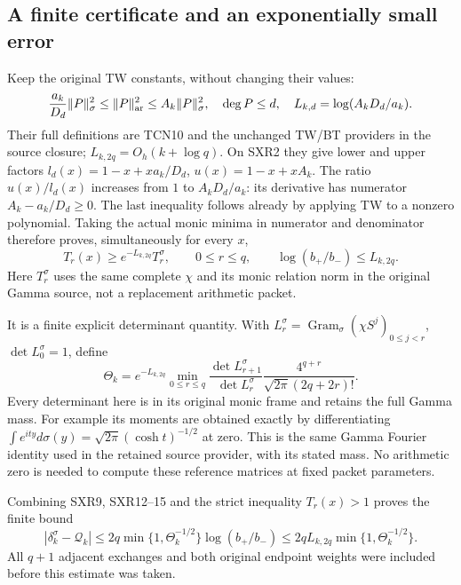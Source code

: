 \subsection{A finite certificate and an exponentially small error}

Keep the original TW constants, without changing their values:
\[
 \frac{a_k}{D_d}\|P\|_\sigma^2\le\|P\|_{\rm ar}^2
                      \le A_k\|P\|_\sigma^2,
 \quad \deg P\le d,\quad
 L_{k,d}=\log(A_kD_d/a_k).
\]
Their full definitions are TCN10 and the unchanged TW/BT providers
in the source closure; $L_{k,2q}=O_h(k+\log q)$. On SXR2 they
give lower and upper factors
$l_d(x)=1-x+x a_k/D_d$, $u(x)=1-x+xA_k$.
The ratio $u(x)/l_d(x)$ increases from $1$ to
$A_kD_d/a_k$: its derivative has numerator $A_k-a_k/D_d\ge0$.
The last inequality follows already by applying TW to a nonzero
polynomial. Taking the actual monic minima in numerator and
denominator therefore proves, simultaneously for every $x$,
\begin{equation}\tag{SXR14}
 T_r(x)\ge e^{-L_{k,2q}}T_r^\sigma,
 \qquad 0\le r\le q,\qquad
 \log(b_+/b_-)\le L_{k,2q}.
\end{equation}
Here $T_r^\sigma$ uses the same complete $\chi$ and its monic
relation norm in the original Gamma source, not a replacement
arithmetic packet.

It is a finite explicit determinant quantity. With
$L_r^\sigma=\operatorname{Gram}_\sigma(\chi S^j)_{0\le j<r}$,
$\det L_0^\sigma=1$, define
\begin{equation}\tag{SXR15}
 \Theta_k=e^{-L_{k,2q}}
   \min_{0\le r\le q}
   \frac{\det L_{r+1}^\sigma}{\det L_r^\sigma}
       \frac{4^{q+r}}{\sqrt{2\pi}(2q+2r)!}.
\end{equation}
Every determinant here is in its original monic frame and retains
the full Gamma mass. For example its moments are obtained exactly
by differentiating
$\int e^{ity}d\sigma(y)=\sqrt{2\pi}(\cosh t)^{-1/2}$ at zero.
This is the same Gamma Fourier identity used in the retained source
provider, with its stated mass. No arithmetic zero is needed to
compute these reference matrices at fixed packet parameters.

Combining SXR9, SXR12--15 and the strict inequality $T_r(x)>1$
proves the finite bound
\begin{equation}\tag{SXR16}
 \boxed{|\delta_k^\sigma-\mathcal Q_k|
 \le 2q\min\{1,\Theta_k^{-1/2}\}\log(b_+/b_-)
 \le 2q L_{k,2q}\min\{1,\Theta_k^{-1/2}\}.}
\end{equation}
All $q+1$ adjacent exchanges and both original endpoint weights
were included before this estimate was taken.

